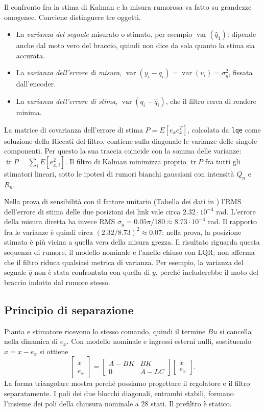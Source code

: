 Il confronto fra la stima di Kalman e la misura rumorosa va fatto su
grandezze omogenee. Conviene distinguere tre oggetti.
\begin{itemize}
\item La \emph{varianza del segnale} misurato o stimato, per esempio
$\operatorname{var}(\hat q_1)$: dipende anche dal moto vero del braccio,
quindi non dice da sola quanto la stima sia accurata.
\item La \emph{varianza dell'errore di misura}, $\operatorname{var}(y_i-q_i)
=\operatorname{var}(v_i)=\sigma_y^2$, fissata dall'encoder.
\item La \emph{varianza dell'errore di stima}, $\operatorname{var}(q_i-\hat q_i)$,
che il filtro cerca di rendere minima.
\end{itemize}
La matrice di covarianza dell'errore di stima $P=E[e_xe_x^T]$, calcolata
da \texttt{lqe} come soluzione della Riccati del filtro, contiene sulla
diagonale le varianze delle singole componenti. Per questo la sua traccia
coincide con la somma delle varianze:
$\operatorname{tr}P=\sum_i E[e_{x,i}^2]$. Il filtro di Kalman minimizza
proprio $\operatorname{tr}P$ fra tutti gli stimatori lineari, sotto le
ipotesi di rumori bianchi gaussiani con intensità $Q_n$ e $R_n$.

Nella prova di sensibilità con il fattore unitario (Tabella dei dati in
) l'RMS dell'errore di stima delle due posizioni
dei link vale circa $2.32\cdot10^{-4}$ rad. L'errore della misura diretta
ha invece RMS $\sigma_y=0.05\pi/180\approx8.73\cdot10^{-4}$ rad. Il
rapporto fra le varianze è quindi circa $(2.32/8.73)^2\approx0.07$:
nella prova, la posizione stimata è più vicina a quella vera della
misura grezza. Il risultato riguarda questa sequenza di rumore, il
modello nominale e l'anello chiuso con LQR; non afferma che il filtro
riduca qualsiasi metrica di varianza. Per esempio, la varianza del
segnale $\hat q$ non è stata confrontata con quella di $y$, perché
includerebbe il moto del braccio indotto dal rumore stesso.

\subsection{Principio di separazione}

Pianta e stimatore ricevono lo stesso comando, quindi il termine $Bu$
si cancella nella dinamica di $e_x$. Con modello nominale e ingressi
esterni nulli, sostituendo $\hat x=x-e_x$ si ottiene
\[
\begin{bmatrix}\dot x\\\dot e_x\end{bmatrix}
=\begin{bmatrix}A-BK&BK\\0&A-LC\end{bmatrix}
\begin{bmatrix}x\\e_x\end{bmatrix}.
\]
La forma triangolare mostra perché possiamo progettare il regolatore
e il filtro separatamente. I poli dei due blocchi diagonali, entrambi
stabili, formano l'insieme dei poli della chiusura nominale a 28 stati.
Il prefiltro è statico.

